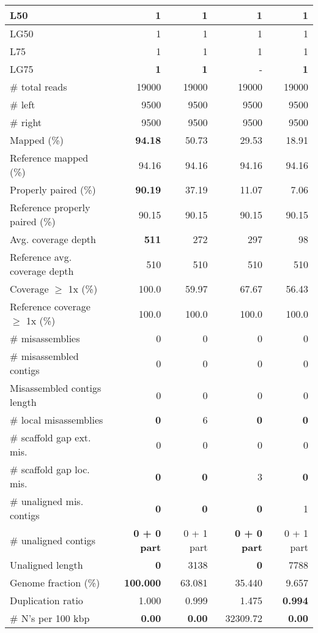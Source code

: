 \documentclass[12pt,a4paper]{article}
\begin{document}
\begin{table}[ht]
\begin{center}
\begin{tabular}{|l*{4}{|r}|}
L50 & 1 & 1 & 1 & 1 \\ \hline
LG50 & 1 & 1 & 1 & 1 \\ \hline
L75 & 1 & 1 & 1 & 1 \\ \hline
LG75 & {\bf 1} & {\bf 1} & - & {\bf 1} \\ \hline
\# total reads & 19000 & 19000 & 19000 & 19000 \\ \hline
\# left & 9500 & 9500 & 9500 & 9500 \\ \hline
\# right & 9500 & 9500 & 9500 & 9500 \\ \hline
Mapped (\%) & {\bf 94.18} & 50.73 & 29.53 & 18.91 \\ \hline
Reference mapped (\%) & 94.16 & 94.16 & 94.16 & 94.16 \\ \hline
Properly paired (\%) & {\bf 90.19} & 37.19 & 11.07 & 7.06 \\ \hline
Reference properly paired (\%) & 90.15 & 90.15 & 90.15 & 90.15 \\ \hline
Avg. coverage depth & {\bf 511} & 272 & 297 & 98 \\ \hline
Reference avg. coverage depth & 510 & 510 & 510 & 510 \\ \hline
Coverage $\geq$ 1x (\%) & 100.0 & 59.97 & 67.67 & 56.43 \\ \hline
Reference coverage $\geq$ 1x (\%) & 100.0 & 100.0 & 100.0 & 100.0 \\ \hline
\# misassemblies & 0 & 0 & 0 & 0 \\ \hline
\# misassembled contigs & 0 & 0 & 0 & 0 \\ \hline
Misassembled contigs length & 0 & 0 & 0 & 0 \\ \hline
\# local misassemblies & {\bf 0} & 6 & {\bf 0} & {\bf 0} \\ \hline
\# scaffold gap ext. mis. & 0 & 0 & 0 & 0 \\ \hline
\# scaffold gap loc. mis. & {\bf 0} & {\bf 0} & 3 & {\bf 0} \\ \hline
\# unaligned mis. contigs & {\bf 0} & {\bf 0} & {\bf 0} & 1 \\ \hline
\# unaligned contigs & {\bf 0 + 0 part} & 0 + 1 part & {\bf 0 + 0 part} & 0 + 1 part \\ \hline
Unaligned length & {\bf 0} & 3138 & {\bf 0} & 7788 \\ \hline
Genome fraction (\%) & {\bf 100.000} & 63.081 & 35.440 & 9.657 \\ \hline
Duplication ratio & 1.000 & 0.999 & 1.475 & {\bf 0.994} \\ \hline
\# N's per 100 kbp & {\bf 0.00} & {\bf 0.00} & 32309.72 & {\bf 0.00} \\ \hline

\end{tabular}
\end{center}
\end{table}
\end{document}
